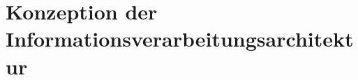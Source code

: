 %
%
%
%
%

\section{Konzeption der Informationsverarbeitungsarchitektur}
\label{sec:architekturkonzept}

